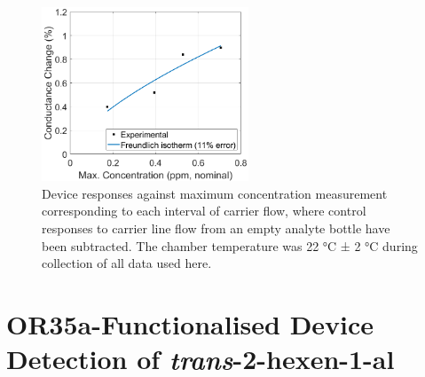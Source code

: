 \documentclass[
  a4paper,
]{scrbook}
\begin{document}
\begin{figure}

{\centering \includegraphics[width=0.55\textwidth,height=\textheight]{figures/ch9/EtHex-ratio-comparison.png}

}

\caption[Device responses against maximum concentration measurement
corresponding to each interval of carrier flow, where control responses
to carrier line flow from an empty analyte bottle have been
subtracted.]{\label{fig-EtHex-ratio-comparison}Device responses against
maximum concentration measurement corresponding to each interval of
carrier flow, where control responses to carrier line flow from an empty
analyte bottle have been subtracted. The chamber temperature was 22 °C ±
2 °C during collection of all data used here.}

\end{figure}

\hypertarget{or35a-functionalised-device-detection-of-trans-2-hexen-1-al}{%
\section{\texorpdfstring{OR35a-Functionalised Device Detection of
\emph{trans}-2-hexen-1-al}{OR35a-Functionalised Device Detection of trans-2-hexen-1-al}}\label{or35a-functionalised-device-detection-of-trans-2-hexen-1-al}}
\end{document}
